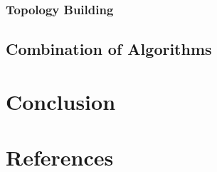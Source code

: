 \subsubsection{Topology Building}
\label{sec:Listings}


\subsection{Combination of Algorithms}
\label{sec:Listings}


\section{Conclusion}
\label{sec:Conclusion}


\section{References}
\label{sec:References}

